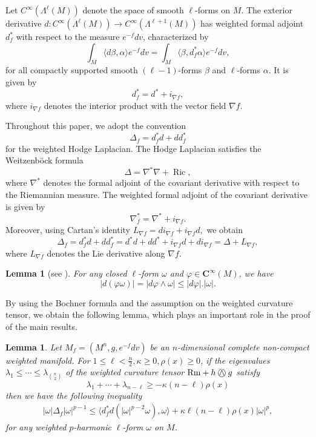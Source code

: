 \documentclass[10pt,a4paper]{amsart}
\newtheorem{lemma}[theorem]{\indent\sc Lemma}
\numberwithin{equation}{section}
\newcommand{\KN}{\mathbin{\bigcirc\mspace{-15mu}\wedge\mspace{3mu}}}
\begin{document}
Let $C^\infty(\Lambda^\ell(M))$ denote the
space of smooth $\ell$-forms on $M$. The exterior derivative
$d:C^\infty(\Lambda^\ell(M))
\longrightarrow
C^\infty(\Lambda^{\ell+1}(M))$
has weighted formal adjoint $d_f^*$ with respect to the measure
$e^{-f}dv$, characterized by
\[
\int_M \langle d\beta,\alpha\rangle e^{-f}dv
=
\int_M \langle \beta,d_f^*\alpha\rangle e^{-f}dv,
\]
for all compactly supported smooth $(\ell-1)$-forms $\beta$ and
$\ell$-forms $\alpha$. It is given by
\[
d_f^*=d^*+i_{\nabla f},
\]
where $i_{\nabla f}$ denotes the interior product with the vector field
$\nabla f$.

Throughout this paper, we adopt the convention
\[
\Delta_f=d_f^*d+dd_f^*
\]
for the weighted Hodge Laplacian. 
The Hodge Laplacian satisfies the Weitzenb\"ock formula
\begin{equation}\label{eq:HodgeLaplacian}
    \Delta=\nabla^*\nabla+\operatorname{Ric},
\end{equation}
where $\nabla^*$ denotes the formal adjoint of the covariant derivative with respect to the Riemannian measure. The weighted formal adjoint of the covariant derivative is given by
\[
\nabla_f^*=\nabla^*+i_{\nabla f}.
\]
Moreover, using Cartan's identity
$L_{\nabla f}=di_{\nabla f}+i_{\nabla f}d,$
we obtain
\begin{equation}\label{eq:weighted_hodge}
\Delta_f
=d_f^*d+dd_f^*  
=d^*d+dd^*+i_{\nabla f}d+di_{\nabla f} 
=\Delta+L_{\nabla f},
\end{equation}
where $L_{\nabla f}$ denotes the Lie derivative along $\nabla f$.

\begin{lemma} [see \cite{DS19}]  \label{d}
	For any closed $\ell$-form $\omega$ and $\varphi \in \mathbf{C} ^\infty (M)$, we have
	$$|d(\varphi \omega)|=|d \varphi \wedge \omega| \le |d \varphi|. |\omega|.$$	
\end{lemma}



By using the Bochner formula and the assumption on the weighted curvature tensor, we obtain the following lemma, which plays an important role in the proof of the main results.
\begin{lemma}\label{Boc}
	Let $M_f=(M^n,g,e^{-f}dv)$ be an $n$-dimensional complete non-compact weighted manifold. For $1\le \ell <\frac{n}{2}, \kappa \ge 0, \rho(x)\ge 0$, if the eigenvalues $\lambda_1\le \cdots \le \lambda_{\binom{n}{2}}$  
	of the weighted curvature tensor
	$\mathrm{Rm}+h \KN g$
	satisfy $$\lambda_1+\cdots+\lambda_{n-\ell}\ge -\kappa(n-\ell)\rho(x)	$$
	then we have the following inequality
	\begin{align} \label{BocF}
	|\omega| \Delta_f |\omega|^{p-1} \le \langle d^*_f d (|\omega|^{p-2}\omega), \omega\rangle+\kappa \ell (n-\ell) \rho(x)|\omega|^p,
\end{align}
	for any weighted $p$-harmonic $\ell$-form $\omega$ on $M$.
\end{lemma}
\end{document}

